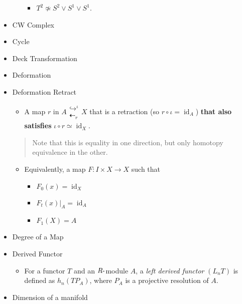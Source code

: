 \begin{itemize}
\begin{itemize}
    \begin{itemize}
    \tightlist
    \item
      \(T^2 \not\simeq S^2 \vee S^1 \vee S^1\). 
    \end{itemize}
  \end{itemize}
\item
  CW Complex
\item
  Cycle
\item
  Deck Transformation
\item
  Deformation
\item
  Deformation Retract

  \begin{itemize}
  \tightlist
  \item
    A map \(r\) in
    \(A\mathrel{\textstyle\substack{\hookrightarrow^{\iota}\\\textstyle\dashleftarrow_{r}}} X\)
    that is a retraction (so \(r\circ \iota = \operatorname{id}_A\))
    \textbf{that also satisfies}
    \(\iota \circ r \simeq\operatorname{id}_X\).
  \end{itemize}

  \begin{quote}
  Note that this is equality in one direction, but only homotopy
  equivalence in the other.
  \end{quote}

  \begin{itemize}
  \tightlist
  \item
    Equivalently, a map \(F:I\times X\to X\) such that

    \begin{itemize}
    \tightlist
    \item
      \(F_0(x) = \operatorname{id}_X\)
    \item
      \(F_t(x)\mathrel{\Big|}_A = \operatorname{id}_A\)
    \item
      \(F_1(X) = A\)
    \end{itemize}
  \end{itemize}
\item
  Degree of a Map
\item
  Derived Functor

  \begin{itemize}
  \tightlist
  \item
    For a functor \(T\) and an \(R{\hbox{-}}\)module \(A\), a \emph{left
    derived functor} \((L_nT)\) is defined as \(h_n(TP_A)\), where
    \(P_A\) is a projective resolution of \(A\).
  \end{itemize}
\item
  Dimension of a manifold


\end{itemize}
